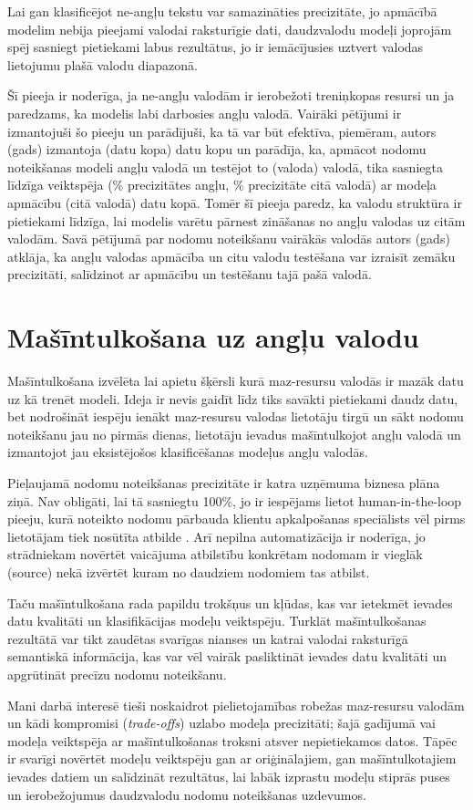 Lai gan klasificējot ne-angļu tekstu var samazināties precizitāte, jo apmācībā modelim nebija pieejami valodai raksturīgie dati, daudzvalodu modeļi joprojām spēj sasniegt pietiekami labus rezultātus, jo ir iemācījusies uztvert valodas lietojumu plašā valodu diapazonā.

Šī pieeja ir noderīga, ja ne-angļu valodām ir ierobežoti treniņkopas resursi un ja paredzams, ka modelis labi darbosies angļu valodā. Vairāki pētījumi ir izmantojuši šo pieeju un parādījuši, ka tā var būt efektīva, piemēram, autors (gads) izmantoja (datu kopa) datu kopu un parādīja, ka, apmācot nodomu noteikšanas modeli angļu valodā un testējot to (valoda) valodā, tika sasniegta līdzīga veiktspēja (\% precizitātes angļu, \% precizitāte citā valodā) ar modeļa apmācību (citā valodā) datu kopā. Tomēr šī pieeja paredz, ka valodu struktūra ir pietiekami līdzīga, lai modelis varētu pārnest zināšanas no angļu valodas uz citām valodām. Savā pētījumā par nodomu noteikšanu vairākās valodās autors (gads) atklāja, ka angļu valodas apmācība un citu valodu testēšana var izraisīt zemāku precizitāti, salīdzinot ar apmācību un testēšanu tajā pašā valodā.


\section{Mašīntulkošana uz angļu valodu}


Mašīntulkošana izvēlēta lai apietu šķērsli kurā maz-resursu valodās ir mazāk datu uz kā trenēt modeli. Ideja ir nevis gaidīt līdz tiks savākti pietiekami daudz datu, bet nodrošināt iespēju ienākt maz-resursu valodas lietotāju tirgū un sākt nodomu noteikšanu jau no pirmās dienas, lietotāju ievadus mašīntulkojot angļu valodā un izmantojot jau eksistējošos klasificēšanas modeļus angļu valodās. 

Pieļaujamā nodomu noteikšanas precizitāte ir katra uzņēmuma biznesa plāna ziņā. Nav obligāti, lai tā sasniegtu 100\%, jo ir iespējams lietot human-in-the-loop pieeju, kurā noteikto nodomu pārbauda klientu apkalpošanas speciālists vēl pirms lietotājam tiek nosūtīta atbilde \cite{paikens2020}. Arī nepilna automatizācija ir noderīga, jo strādniekam novērtēt vaicājuma atbilstību konkrētam nodomam ir vieglāk (source) nekā izvērtēt kuram no daudziem nodomiem tas atbilst.

Taču mašīntulkošana rada papildu trokšņus un kļūdas, kas var ietekmēt ievades datu kvalitāti un klasifikācijas modeļu veiktspēju. Turklāt mašīntulkošanas rezultātā var tikt zaudētas svarīgas nianses un katrai valodai raksturīgā semantiskā informācija, kas var vēl vairāk pasliktināt ievades datu kvalitāti un apgrūtināt precīzu nodomu noteikšanu.

Mani darbā interesē tieši noskaidrot pielietojamības robežas maz-resursu valodām un kādi kompromisi (\textit{trade-offs}) uzlabo modeļa precizitāti; šajā gadījumā vai modeļa veiktspēja ar mašīntulkošanas troksni atsver nepietiekamos datos. Tāpēc ir svarīgi novērtēt modeļu veiktspēju gan ar oriģinālajiem, gan mašīntulkotajiem ievades datiem un salīdzināt rezultātus, lai labāk izprastu modeļu stiprās puses un ierobežojumus daudzvalodu nodomu noteikšanas uzdevumos.
